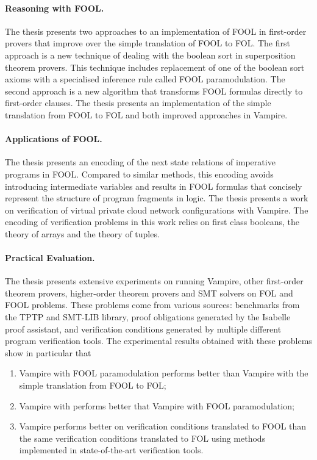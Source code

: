 \paragraph{Reasoning with FOOL.}
The thesis presents two approaches to an implementation of FOOL in first-order provers that improve over the simple translation of FOOL to FOL. The first approach is a new technique of dealing with the boolean sort in superposition theorem provers. This technique includes replacement of one of the boolean sort axioms with a specialised inference rule called FOOL paramodulation. The second approach is a new algorithm \nfcnf{} that transforms FOOL formulas directly to first-order clauses. The thesis presents an implementation of the simple translation from FOOL to FOL and both improved approaches in Vampire.

\paragraph{Applications of FOOL.}
The thesis presents an encoding of the next state relations of imperative programs in FOOL. Compared to similar methods, this encoding avoids introducing intermediate variables and results in FOOL formulas that concisely represent the structure of program fragments in logic.
The thesis presents a work on verification of virtual private cloud network configurations with Vampire. The encoding of verification problems in this work relies on first class booleans, the theory of arrays and the theory of tuples.

\paragraph{Practical Evaluation.}
The thesis presents extensive experiments on running Vampire, other first-order theorem provers, higher-order theorem provers and SMT solvers on FOL and FOOL problems. These problems come from various sources: benchmarks from the TPTP and SMT-LIB library, proof obligations generated by the Isabelle proof assistant, and verification conditions generated by multiple different program verification tools. The experimental results obtained with these problems show in particular that \begin{enumerate}
  \item Vampire with FOOL paramodulation performs better than Vampire with the simple translation from FOOL to FOL;
  \item Vampire with \nfcnf{} performs better that Vampire with FOOL paramodulation;
  \item Vampire performs better on verification conditions translated to FOOL than the same verification conditions translated to FOL using methods implemented in state-of-the-art verification tools.
\end{enumerate}

